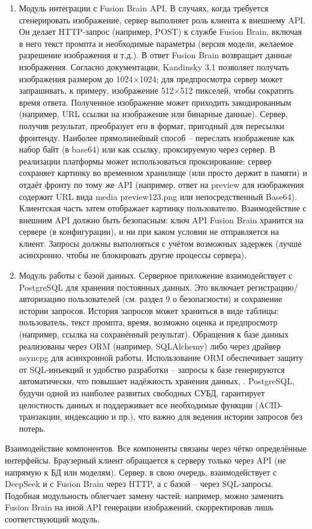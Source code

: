 \begin{enumerate}[label=\arabic*]
    \item Модуль интеграции с Fusion Brain API. В случаях, когда требуется сгенерировать изображение, сервер выполняет роль клиента к внешнему API. Он делает HTTP-запрос (например, POST) к службе Fusion Brain, включая в него текст промпта и необходимые параметры (версия модели, желаемое разрешение изображения и т.д.). В ответ Fusion Brain возвращает данные изображения. Согласно документации, Kandinsky 3.1 позволяет получать изображения размером до 1024×1024; для предпросмотра сервер может запрашивать, к примеру, изображение 512×512 пикселей, чтобы сократить время ответа\cite{fusionbrain:docs}. Полученное изображение может приходить закодированным (например, URL ссылки на изображение или бинарные данные). Сервер, получив результат, преобразует его в формат, пригодный для пересылки фронтенду. Наиболее прямолинейный способ – переслать изображение как набор байт (в base64) или как ссылку, проксируемую через сервер. В реализации платформы может использоваться проксирование: сервер сохраняет картинку во временном хранилище (или просто держит в памяти) и отдаёт фронту по тому же API (например, ответ на preview для изображения содержит URL вида media preview123.png или непосредственный Base64). Клиентская часть затем отображает картинку пользователю. Взаимодействие с внешним API должно быть безопасным: ключ API Fusion Brain хранится на сервере (в конфигурации), и ни при каком условии не отправляется на клиент. Запросы должны выполняться с учётом возможных задержек (лучше асинхронно, чтобы не блокировать другие процессы сервера).
    \item Модуль работы с базой данных. Серверное приложение взаимодействует с PostgreSQL для хранения постоянных данных. Это включает регистрацию/авторизацию пользователей (см. раздел 9 о безопасности) и сохранение истории запросов. История запросов может храниться в виде таблицы: пользователь, текст промпта, время, возможно оценка и предпросмотр (например, ссылка на сохранённый результат). Обращения к базе данных реализованы через ORM (например, SQLAlchemy) либо через драйвер asyncpg для асинхронной работы. Использование ORM обеспечивает защиту от SQL-инъекций и удобство разработки – запросы к базе генерируются автоматически, что повышает надёжность хранения данных\cite{postgresql:skillfactory}, \cite{postgresql:wiki}. PostgreSQL, будучи одной из наиболее развитых свободных СУБД, гарантирует целостность данных и поддерживает все необходимые функции (ACID-транзакции, индексацию и пр.), что важно для ведения истории запросов без потерь. 
\end{enumerate}
Взаимодействие компонентов. Все компоненты связаны через чётко определённые интерфейсы. Браузерный клиент обращается к серверу только через API (не напрямую к БД или моделям). Сервер, в свою очередь, взаимодействует с DeepSeek и с Fusion Brain через HTTP, а с базой – через SQL-запросы. Подобная модульность облегчает замену частей: например, можно заменить Fusion Brain на иной API генерации изображений, скорректировав лишь соответствующий модуль.

